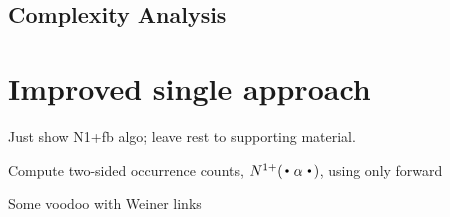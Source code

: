 \subsection{Complexity Analysis}

\section{Improved single \CST approach}

Just show N1+fb algo; leave rest to supporting material.

\begin{algorithm}
  \caption{Compute two-sided occurrence counts, $\nlplus{\dotpatdot}$, using only forward \CST 
    \label{alg:n1plusfb_wt}}
  \begin{algorithmic}[1]
        \If{$\depth{\tf}{\nf} > |\alpha|$}   
        \Else
              \State Some voodoo with Weiner links
            \EndFor
          \EndIf
      \State {}
    \EndFunction
  \end{algorithmic}
\end{algorithm}



